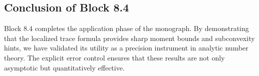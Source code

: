 \subsection*{Conclusion of Block 8.4}
Block 8.4 completes the application phase of the monograph. By demonstrating that the localized trace formula provides sharp moment bounds and subconvexity hints, we have validated its utility as a precision instrument in analytic number theory. The explicit error control ensures that these results are not only asymptotic but quantitatively effective.
